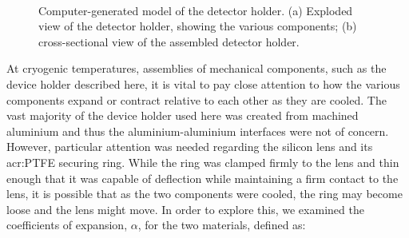 \begin{figure}[tb]
\begin{center}
\\
\caption[Detector holder]{Computer-generated model of the detector holder. (a) Exploded view of the detector holder, showing the various components; (b) cross-sectional view of the assembled detector holder.}
\label{fig:deviceHolder}
\end{center}
\end{figure}
\par 
At cryogenic temperatures, assemblies of mechanical components, such as the device holder described here, it is vital to pay close attention to how the various components expand or contract relative to each other as they are cooled. The vast majority of the device holder used here was created from machined aluminium and thus the aluminium-aluminium interfaces were not of concern. However, particular attention was needed regarding the silicon lens and its \gls{acr:PTFE} securing ring. While the ring was clamped firmly to the lens and thin enough that it was capable of deflection while maintaining a firm contact to the lens, it is possible that as the two components were cooled, the ring may become loose and the lens might move. In order to explore this, we examined the coefficients of expansion, $\alpha$, for the two materials, defined as:

